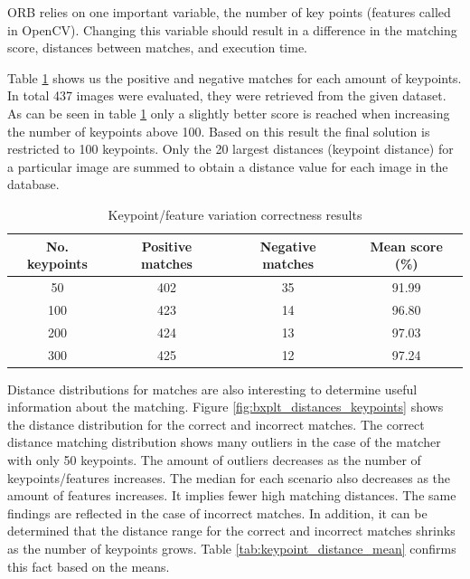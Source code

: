 



ORB relies on one important variable, the number of key points (features called in OpenCV). Changing this variable should result in a difference in the matching score, distances between matches, and execution time.

Table \ref{tab:keypoint_feature_variation} shows us the positive and negative matches for each amount of keypoints. In total 437 images were evaluated, they were retrieved from the given dataset. As can be seen in table \ref{tab:keypoint_feature_variation} only a slightly better score is reached when increasing the number of keypoints above 100.  Based on this result the final solution is restricted to 100 keypoints. Only the 20 largest distances (keypoint distance) for a particular image are summed to obtain a distance value for each image in the database.


\renewcommand{\arraystretch}{1.2}
\begin{table}[htbp]
    \caption{Keypoint/feature variation correctness results}
    \centering
    \begin{center}
        \begin{tabular}{ |c|c|c|c|  }
         \hline
         No. keypoints& Positive matches &Negative matches&Mean score (\%)\\
         \hline \hline
         50  & 402 & 35 & 91.99\\
         \hline
         100 & 423 & 14 & 96.80\\
         \hline
         200 & 424 & 13 & 97.03\\
         \hline
         300 & 425 & 12 & 97.24\\
         \hline
        \end{tabular}
    \end{center}
    \label{tab:keypoint_feature_variation}
\end{table}

Distance distributions for matches are also interesting to determine useful information about the matching. Figure \ref{fig:bxplt_distances_keypoints} shows the distance distribution for the correct and incorrect matches. The correct distance matching distribution shows many outliers in the case of the matcher with only 50 keypoints. The amount of outliers decreases as the number of keypoints/features increases. The median for each scenario also decreases as the amount of features increases. It implies fewer high matching distances. The same findings are reflected in the case of incorrect matches. In addition, it can be determined that the distance range for the correct and incorrect matches shrinks as the number of keypoints grows. Table \ref{tab:keypoint_distance_mean} confirms this fact based on the means. 



